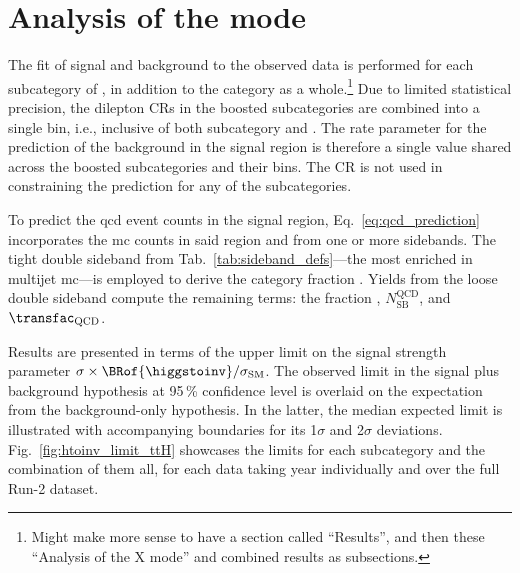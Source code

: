 \section{Analysis of the \texorpdfstring{\ttH}{ttH} mode}
\label{sec:htoinv_analysis_ttH}

The fit of signal and background to the observed data is performed for each subcategory of \ttH, in addition to the category as a whole.\footnote{Might make more sense to have a section called ``Results'', and then these ``Analysis of the X mode'' and combined results as subsections.} Due to limited statistical precision, the dilepton \glspl{CR} in the boosted subcategories are combined into a single bin, i.e., inclusive of both subcategory and \ptmiss. The rate parameter for the prediction of the \ztonunu background in the signal region is therefore a single value shared across the boosted subcategories and their \ptmiss bins. The \singlePhotonCr \gls{CR} is not used in constraining the \ztonunu prediction for any of the subcategories.

To predict the \acrshort{qcd} event counts in the signal region, Eq.~\ref{eq:qcd_prediction} incorporates the \acrshort{mc} counts in said region and from one or more sidebands. The tight double sideband from Tab.~\ref{tab:sideband_defs}---the most enriched in multijet \acrshort{mc}---is employed to derive the category fraction \catFraction. Yields from the loose double sideband compute the remaining terms: the \ptmiss fraction \metFraction, $N_{\mathrm{SB}}^{\mathrm{QCD}}$, and $\transfac_{\mathrm{QCD}}$.

Results are presented in terms of the upper limit on the signal strength parameter $\sigma \times \BRof{\higgstoinv} / \sigma_{\mathrm{SM}}$. The observed limit in the signal plus background hypothesis at 95\,\% confidence level is overlaid on the expectation from the background-only hypothesis. In the latter, the median expected limit is illustrated with accompanying boundaries for its 1$\sigma$ and 2$\sigma$ deviations. Fig.~\ref{fig:htoinv_limit_ttH} showcases the limits for each \ttH subcategory and the combination of them all, for each data taking year individually and over the full Run-2 dataset.

